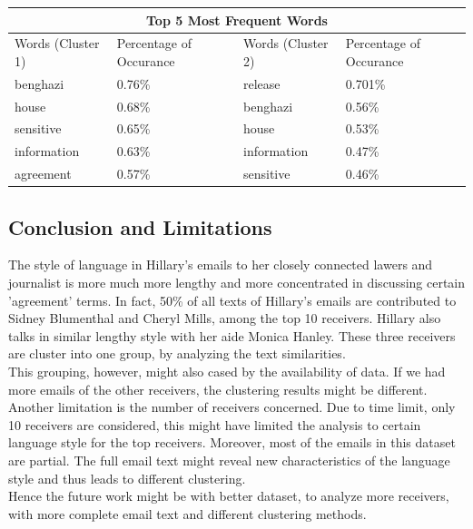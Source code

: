 \documentclass[11pt,a4paper]{article}
\begin{document}
\begin{center}
\begin{tabular}{ |p{3cm}|p{3cm}|| p{3cm}|p{3cm}|  }
 \hline
 \multicolumn{4}{|c|}{Top 5 Most Frequent Words} \\
 \hline
 Words (Cluster 1)  & Percentage of Occurance & Words (Cluster 2) & Percentage of Occurance\\
 \hline
 benghazi & 0.76\% & release  & 0.701\% \\
 house &  0.68\% & benghazi & 0.56\% \\
 sensitive & 0.65\% & house & 0.53\%\\
 information & 0.63\% & information & 0.47\%\\
 agreement & 0.57\% &  sensitive  & 0.46\% \\
 \hline
\end{tabular}
\end{center}

\newpage
\subsection*{Conclusion and Limitations}
The style of language in Hillary's emails to her closely connected lawers and journalist is more much more lengthy and more concentrated in discussing certain 'agreement' terms. In fact, 50\% of all texts of Hillary's emails are contributed to Sidney Blumenthal and Cheryl Mills, among the top 10 receivers. Hillary also talks in similar lengthy style with her aide Monica Hanley. These three receivers are cluster into one group, by analyzing the text similarities. 
\\
This grouping, however, might also cased by the availability of data. If we had more emails of the other receivers, the clustering results might be different. Another limitation is the number of receivers concerned. Due to time limit, only 10 receivers are considered, this might have limited the analysis to certain language style for the top receivers. Moreover, most of the emails in this dataset are partial. The full email text might reveal new characteristics of the language style and thus leads to different clustering. \\
Hence the future work might be with better dataset, to analyze more receivers, with more complete email text and different clustering methods.
\end{document}
